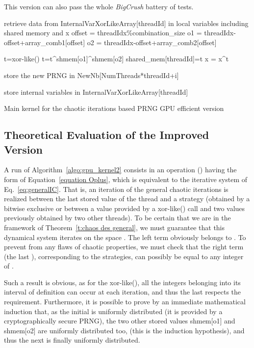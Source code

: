 \documentclass{article}
\begin{document}
This version  can also pass the whole {\it BigCrush} battery of tests.

\begin{algorithm}


 {
  retrieve data from InternalVarXorLikeArray[threadId] in local variables including shared memory and x\;
  offset = threadIdx\%combination\_size\;
  o1 = threadIdx-offset+array\_comb1[offset]\;
  o2 = threadIdx-offset+array\_comb2[offset]\;
   {
    t=xor-like()\;
    t=t\textasciicircum shmem[o1]\textasciicircum shmem[o2]\;
    shared\_mem[threadId]=t\;
    x = x\textasciicircum t\;

    store the new PRNG in NewNb[NumThreads*threadId+i]\;
  }
  store internal variables in InternalVarXorLikeArray[threadId]\;
}

\caption{Main kernel for the chaotic iterations based PRNG GPU efficient
version\label{IR}}
\label{algo:gpu_kernel2} 
\end{algorithm}

\subsection{Theoretical Evaluation of the Improved Version}

A run of Algorithm~\ref{algo:gpu_kernel2} consists in an operation () having 
the form of Equation~\ref{equation Oplus}, which is equivalent to the iterative
system of Eq.~\ref{eq:generalIC}. That is, an iteration of the general chaotic
iterations is realized between the last stored value  of the thread and a strategy 
(obtained by a bitwise exclusive or between a value provided by a xor-like() call
and two values previously obtained by two other threads).
To be certain that we are in the framework of Theorem~\ref{t:chaos des general},
we must guarantee that this dynamical system iterates on the space 
.
The left term  obviously belongs to .
To prevent from any flaws of chaotic properties, we must check that the right 
term (the last ), corresponding to the strategies,  can possibly be equal to any
integer of . 

Such a result is obvious, as for the xor-like(), all the
integers belonging into its interval of definition can occur at each iteration, and thus the 
last  respects the requirement. Furthermore, it is possible to
prove by an immediate mathematical induction that, as the initial 
is uniformly distributed (it is provided by a cryptographically secure PRNG),
the two other stored values shmem[o1] and shmem[o2] are uniformly distributed too,
(this is the induction hypothesis), and thus the next  is finally uniformly distributed.
\end{document}
